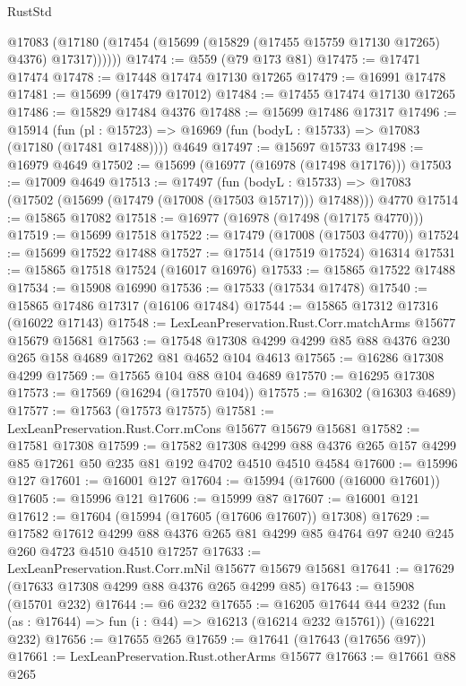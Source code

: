 \begin{lexlean}{RustStd}
\begin{coremodule}
        @17083 (@17180 (@17454 (@15699 (@15829 (@17455 @15759 @17130 @17265) @4376) @17317))))))
@17474 := @559 (@79 @173 @81)
@17475 := @17471 @17474
@17478 := @17448 @17474 @17130 @17265
@17479 := @16991 @17478
@17481 := @15699 (@17479 @17012)
@17484 := @17455 @17474 @17130 @17265
@17486 := @15829 @17484 @4376
@17488 := @15699 @17486 @17317
@17496 := @15914
    (fun (pl : @15723) => @16969 (fun (bodyL : @15733) => @17083 (@17180 (@17481 @17488))))
    @4649
@17497 := @15697 @15733
@17498 := @16979 @4649
@17502 := @15699 (@16977 (@16978 (@17498 @17176)))
@17503 := @17009 @4649
@17513 := @17497
    (fun (bodyL : @15733) => @17083 (@17502 (@15699 (@17479 (@17008 (@17503 @15717))) @17488)))
    @4770
@17514 := @15865 @17082
@17518 := @16977 (@16978 (@17498 (@17175 @4770)))
@17519 := @15699 @17518
@17522 := @17479 (@17008 (@17503 @4770))
@17524 := @15699 @17522 @17488
@17527 := @17514 (@17519 @17524) @16314
@17531 := @15865 @17518 @17524 (@16017 @16976)
@17533 := @15865 @17522 @17488
@17534 := @15908 @16990
@17536 := @17533 (@17534 @17478)
@17540 := @15865 @17486 @17317 (@16106 @17484)
@17544 := @15865 @17312 @17316 (@16022 @17143)
@17548 := LexLeanPreservation.Rust.Corr.matchArms @15677 @15679 @15681
@17563 := @17548 @17308 @4299 @4299 @85 @88 @4376 @230 @265 @158 @4689 @17262 @81 @4652 @104 @4613
@17565 := @16286 @17308 @4299
@17569 := @17565 @104 @88 @104 @4689
@17570 := @16295 @17308
@17573 := @17569 (@16294 (@17570 @104))
@17575 := @16302 (@16303 @4689)
@17577 := @17563 (@17573 @17575)
@17581 := LexLeanPreservation.Rust.Corr.mCons @15677 @15679 @15681
@17582 := @17581 @17308
@17599 := @17582
    @17308
    @4299
    @88
    @4376
    @265
    @157
    @4299
    @85
    @17261
    @50
    @235
    @81
    @192
    @4702
    @4510
    @4510
    @4584
@17600 := @15996 @127
@17601 := @16001 @127
@17604 := @15994 (@17600 (@16000 @17601))
@17605 := @15996 @121
@17606 := @15999 @87
@17607 := @16001 @121
@17612 := @17604 (@15994 (@17605 (@17606 @17607)) @17308)
@17629 := @17582
    @17612
    @4299
    @88
    @4376
    @265
    @81
    @4299
    @85
    @4764
    @97
    @240
    @245
    @260
    @4723
    @4510
    @4510
    @17257
@17633 := LexLeanPreservation.Rust.Corr.mNil @15677 @15679 @15681
@17641 := @17629 (@17633 @17308 @4299 @88 @4376 @265 @4299 @85)
@17643 := @15908 (@15701 @232)
@17644 := @6 @232
@17655 := @16205
    @17644
    @44
    @232
    (fun (as : @17644) => fun (i : @44) => @16213 (@16214 @232 @15761))
    (@16221 @232)
@17656 := @17655 @265
@17659 := @17641 (@17643 (@17656 @97))
@17661 := LexLeanPreservation.Rust.otherArms @15677
@17663 := @17661 @88 @265

\end{coremodule}
\end{lexlean}
